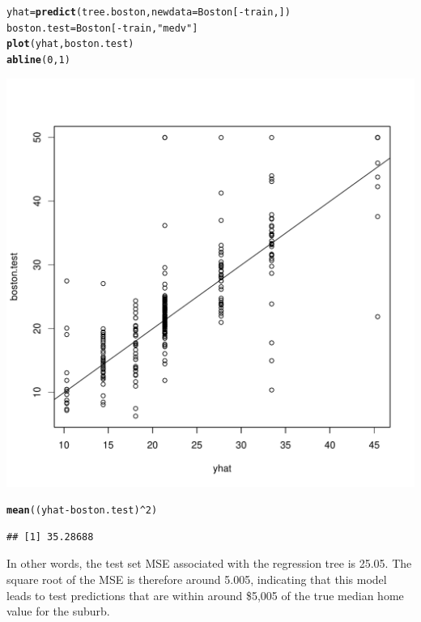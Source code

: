 \documentclass[12pt]{article}\usepackage[]{graphicx}\usepackage[]{color}
\makeatletter
\def\maxwidth{ %
  \ifdim\Gin@nat@width>\linewidth
    \linewidth
  \else
    \Gin@nat@width
  \fi
}
\newcommand{\hlnum}[1]{\textcolor[rgb]{0.686,0.059,0.569}{#1}}%
\newcommand{\hlstr}[1]{\textcolor[rgb]{0.192,0.494,0.8}{#1}}%
\newcommand{\hlopt}[1]{\textcolor[rgb]{0,0,0}{#1}}%
\newcommand{\hlstd}[1]{\textcolor[rgb]{0.345,0.345,0.345}{#1}}%
\newcommand{\hlkwb}[1]{\textcolor[rgb]{0.69,0.353,0.396}{#1}}%
\newcommand{\hlkwc}[1]{\textcolor[rgb]{0.333,0.667,0.333}{#1}}%
\newcommand{\hlkwd}[1]{\textcolor[rgb]{0.737,0.353,0.396}{\textbf{#1}}}%
\newenvironment{kframe}{%
 \def\at@end@of@kframe{}%
 \ifinner\ifhmode%
  \def\at@end@of@kframe{\end{minipage}}%
  \begin{minipage}{\columnwidth}%
 \fi\fi%
 \def\FrameCommand##1{\hskip\@totalleftmargin \hskip-\fboxsep
 \colorbox{shadecolor}{##1}\hskip-\fboxsep
     \hskip-\linewidth \hskip-\@totalleftmargin \hskip\columnwidth}%
 \MakeFramed {\advance\hsize-\width
   \@totalleftmargin\z@ \linewidth\hsize
   \@setminipage}}%
 {\par\unskip\endMakeFramed%
 \at@end@of@kframe}
\newenvironment{knitrout}{}{} %
\makeatother
\begin{document}
\begin{knitrout}
\color{fgcolor}\begin{kframe}
\begin{alltt}
\hlstd{yhat} \hlkwb{=} \hlkwd{predict}\hlstd{(tree.boston,} \hlkwc{newdata}\hlstd{=Boston[}\hlopt{-}\hlstd{train,])}
\hlstd{boston.test} \hlkwb{=} \hlstd{Boston[}\hlopt{-}\hlstd{train,} \hlstr{"medv"}\hlstd{]}
\hlkwd{plot}\hlstd{(yhat, boston.test)}
\hlkwd{abline}\hlstd{(}\hlnum{0}\hlstd{,}\hlnum{1}\hlstd{)}
\end{alltt}
\end{kframe}
\includegraphics[width=\maxwidth]{figure/unnamed-chunk-17-1} 
\begin{kframe}\begin{alltt}
\hlkwd{mean}\hlstd{((yhat}\hlopt{-}\hlstd{boston.test)}\hlopt{^}\hlnum{2}\hlstd{)}
\end{alltt}
\begin{verbatim}
## [1] 35.28688
\end{verbatim}
\end{kframe}
\end{knitrout}

In other words, the test set MSE associated with the regression tree is 25.05. The square root of the MSE is therefore around 5.005, indicating that this model leads to test predictions that are within around \$5,005 of the true median home value for the suburb.
\end{document}
